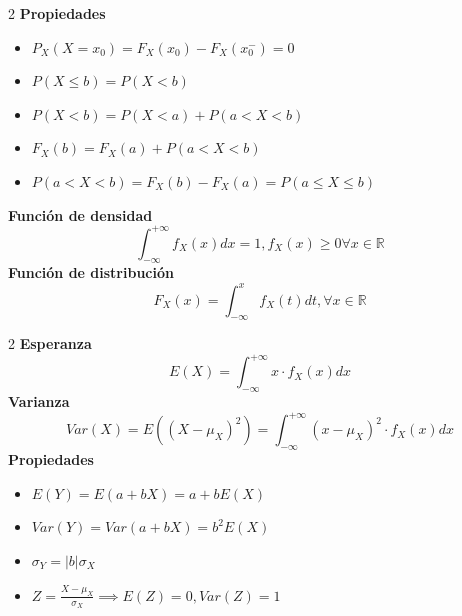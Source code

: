 \documentclass[10pt,a4paper]{article}
\begin{document}
\begin{tcolorbox}[title=Variables Aleatorias Continuas, equal height group=VAC1]
    \begin{multicols}{2}
        \textbf{Propiedades}
        \begin{itemize}
            \item $P_X(X = x_0) = F_X(x_0) - F_X(x_0^-) = 0$
            \item $P(X \leq b) = P(X < b)$
            \item $P(X < b) = P(X < a) + P(a < X < b)$
            \item $F_X(b) = F_X(a) + P(a < X < b)$
            \item $P(a < X < b) = F_X(b) - F_X(a) = P(a \leq X \leq b)$
        \end{itemize}
        \textbf{Función de densidad}
        \[
            \int_{-\infty}^{+\infty}{f_X(x)dx} = 1, f_X(x) \geq 0 \forall x \in \mathbb{R}
        \]
        \textbf{Función de distribución}
        \[
            F_X(x) = \int_{-\infty}^{x}f_X(t)dt, \forall x \in \mathbb{R}
        \]
    \end{multicols}
    \vspace*{1pt}
\end{tcolorbox}
\begin{tcolorbox}[title=Esperanza y Varianza, equal height group=VAC2]
    \begin{multicols}{2}
        \textbf{Esperanza}
        \[
            E(X) = \int_{-\infty}^{+\infty}{x \cdot f_X(x)dx}
        \]
        \textbf{Varianza}
        \[
            Var(X) = E((X - \mu_X)^2) = \int_{-\infty}^{+\infty}{(x - \mu_X)^2 \cdot f_X(x)dx}
        \]
        \textbf{Propiedades}
        \begin{itemize}
            \item $E(Y) = E(a + bX) = a + bE(X)$
            \item $Var(Y) = Var(a + bX) = b^2E(X)$
            \item $\sigma_Y = |b|\sigma_X$
            \item $Z = \frac{X - \mu_X}{\sigma_X} \implies E(Z) = 0, Var(Z) = 1$
        \end{itemize}
    \end{multicols}
    \vspace*{5pt}
\end{tcolorbox}

\end{document}
